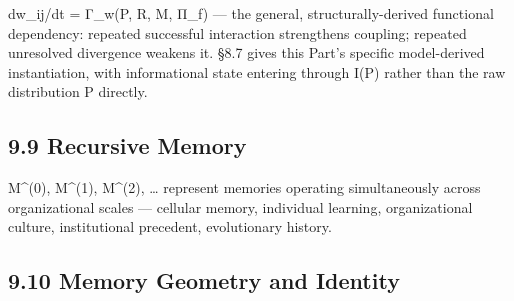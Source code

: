 \documentclass[
]{article}
\begin{document}
dw\_ij/dt = Γ\_w(P, R, M, Π\_f) --- the general, structurally-derived
functional dependency: repeated successful interaction strengthens
coupling; repeated unresolved divergence weakens it. §8.7 gives this
Part's specific model-derived instantiation, with informational state
entering through I(P) rather than the raw distribution P directly.

\hypertarget{recursive-memory}{%
\subsection{9.9 Recursive Memory}\label{recursive-memory}}

M\^{}(0), M\^{}(1), M\^{}(2), \ldots{} represent memories operating
simultaneously across organizational scales --- cellular memory,
individual learning, organizational culture, institutional precedent,
evolutionary history.

\hypertarget{memory-geometry-and-identity}{%
\subsection{9.10 Memory Geometry and
Identity}\label{memory-geometry-and-identity}}
\end{document}
